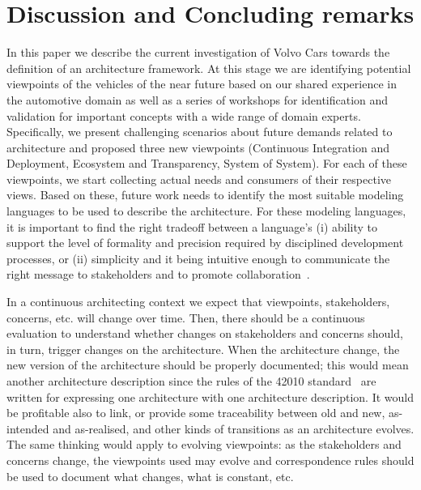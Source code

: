 \section{Discussion and Concluding remarks}\label{sec:conclusion}

In this paper we describe the current investigation of Volvo Cars towards the definition of an architecture framework.
At this stage we are identifying potential viewpoints of the vehicles of the near future based on our shared experience in the automotive domain as well as a series of workshops for identification and validation for important concepts with a wide range of domain experts. 
Specifically, we present challenging scenarios about future demands related to architecture and proposed three new viewpoints (Continuous Integration and Deployment, Ecosystem and Transparency, System of System).
For each of these viewpoints, we start collecting actual needs and consumers of their respective views. 
Based on these, future work needs to identify the most suitable modeling languages to be used to describe the architecture. 
For these modeling languages, it is important to find the right tradeoff between a language's
(i) ability to support the level of formality and precision required by disciplined development processes, or
(ii) simplicity and it being intuitive enough to communicate the right message to stakeholders and to promote collaboration~\cite{IEEESoftwarePatrizio,whatindustrywants}.

In a continuous architecting context we expect that viewpoints, stakeholders, concerns, etc. will change over time. Then, there should be a continuous evaluation to understand whether changes on stakeholders and concerns should, in turn, trigger changes on the architecture.
When the architecture change, the new version of the architecture should be properly documented; this would mean another architecture description since the rules of the 42010 standard~\cite{42010} are written for expressing one architecture with one architecture description.
It would be profitable also to link, or provide some traceability between old and new, as-intended and as-realised, and other kinds of transitions as an architecture evolves. 
The same thinking would apply to evolving viewpoints: as the stakeholders and concerns change, the viewpoints used may evolve and correspondence rules should be used to document what changes, what is constant, etc.


